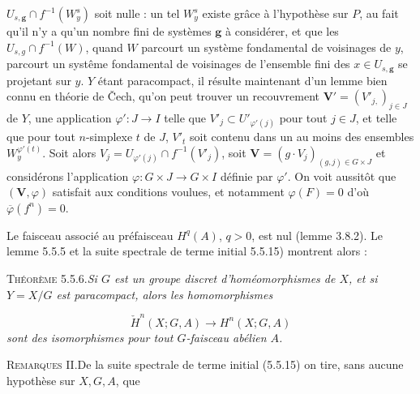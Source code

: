 \clearpage
{}

\noindent $U_{s,\mathbf g}\cap f^{-1}(W^s_y)$ soit nulle : un tel $W^s_y$
existe grâce à l'hypothèse sur $P$, au fait qu'il n'y a qu'un nombre fini de
systèmes $\mathbf g$ à considérer, et que les
$U_{s,g}\cap f^{-1}(W)$, quand $W$ parcourt un système fondamental de
voisinages de $y$, parcourt un systême fondamental de voisinages de l'ensemble
fini des $x\in U_{s,\mathbf g}$ se projetant sur $y$. $Y$ étant paracompact,
il résulte maintenant d'un lemme bien connu en théorie de Čech, qu'on peut
trouver un recouvrement ${\mathbf V}'=(V'_{j,})_{j\in J}$ de $Y$, une application
$\varphi':J\to I$ telle que $V'_j\subset U'_{\varphi'(j)}$ pour tout $j\in J$,
et telle que pour tout $n$-simplexe $t$ de $J$, $V'_t$ soit contenu dans un au
moins des ensembles $W_y^{\varphi'(t)}$. Soit alors
$V_j=U_{\varphi'(j)}\cap f^{-1}(V'_j)$, soit
${\mathbf V}=(g\cdot V_j)_{(g,j)\in G\times J}$ et considérons l'application
$\varphi:G\times J\to G\times I$ définie par $\varphi'$. On voit aussitôt que
$({\mathbf V},\varphi)$ satisfait aux conditions voulues, et notamment
$\varphi(F)=0$ d'où $\overline\varphi(f^n)=0$.

Le faisceau associé au préfaisceau $H^q(A)$, $q>0$, est nul (lemme 3.8.2). Le
lemme 5.5.5 et la suite spectrale de terme initial 5.5.15) montrent alors :

\textsc{Théorème 5.5.6.}\quad \textit{Si $G$ est un groupe discret
d'homéomorphismes de $X$, et si $Y=X/G$ est paracompact, alors les
homomorphismes}

\[
\tag{5.5.14}
\check H^n(X;G,A)\to H^n(X;G,A)
\]
\textit{sont des isomorphismes pour tout $G$-faisceau abélien $A$.}

\textsc{Remarques II.}\quad De la suite spectrale de terme initial
(5.5.15) on tire, sans aucune hypothèse sur $X,G,A$, que

